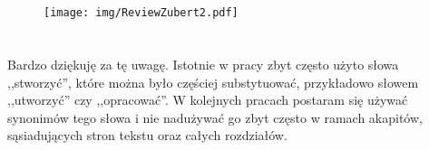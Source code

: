 \section*{}
\begin{frame}
\frametitle{\secname}
\begin{figure}[!ht]
\centering
\texttt{[image: img/ReviewZubert2.pdf]}	
\end{figure}
\end{frame}

\section*{}
\begin{frame}
\frametitle{\secname}
Bardzo dziękuję za tę uwagę. Istotnie w pracy zbyt często użyto słowa ,,stworzyć'', które można było częściej substytuować, przykładowo słowem ,,utworzyć'' czy ,,opracować''. W kolejnych pracach postaram się używać synonimów  tego słowa i nie nadużywać go zbyt często w ramach akapitów, sąsiadujących stron tekstu oraz całych rozdziałów.
\end{frame}